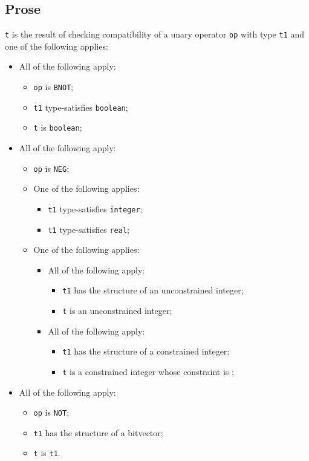 \documentclass{book}
\begin{document}
\subsection{Prose}
  \texttt{t} is the result of checking compatibility of a unary operator \texttt{op} with
  type \texttt{t1} and one of the following applies:
  \begin{itemize}
  \item All of the following apply:
    \begin{itemize}
    \item \texttt{op} is \texttt{BNOT};
    \item \texttt{t1} type-satisfies \texttt{boolean};
    \item \texttt{t} is \texttt{boolean};
    \end{itemize}

  \item All of the following apply:
    \begin{itemize}
    \item \texttt{op} is \texttt{NEG};
    \item One of the following applies:
      \begin{itemize}
      \item \texttt{t1} type-satisfies \texttt{integer}; 
      \item \texttt{t1} type-satisfies \texttt{real};
      \end{itemize}
     \item One of the following applies:
       \begin{itemize}
       \item All of the following apply:
         \begin{itemize}
         \item \texttt{t1} has the structure of an unconstrained integer;
         \item \texttt{t} is an unconstrained integer;
         \end{itemize}
       \item All of the following apply:
         \begin{itemize}
         \item \texttt{t1} has the structure of a constrained integer;
         \item \texttt{t} is a constrained integer whose constraint is ;
         \end{itemize}
       \end{itemize}
    \end{itemize}  

  \item All of the following apply:
    \begin{itemize}
    \item \texttt{op} is \texttt{NOT};
    \item \texttt{t1} has the structure of a bitvector;
    \item \texttt{t} is \texttt{t1}.
    \end{itemize}
  \end{itemize}
\end{document}
